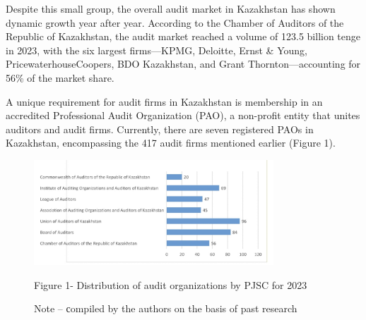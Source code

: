 \begin{multicols}{2}
Despite this small group, the overall audit market in Kazakhstan has
shown dynamic growth year after year. According to the Chamber of
Auditors of the Republic of Kazakhstan, the audit market reached a
volume of 123.5 billion tenge in 2023, with the six largest
firms---KPMG, Deloitte, Ernst \& Young, PricewaterhouseCoopers, BDO
Kazakhstan, and Grant Thornton---accounting for 56\% of the market
share.

A unique requirement for audit firms in Kazakhstan is membership in an
accredited Professional Audit Organization (PAO), a non-profit entity
that unites auditors and audit firms. Currently, there are seven
registered PAOs in Kazakhstan, encompassing the 417 audit firms
mentioned earlier (Figure 1).
\end{multicols}


\begin{figure}[H]
	\centering
	\includegraphics[width=0.8\textwidth]{media/ekon/image7.2}
	\caption*{Figure 1- Distribution of audit organizations by PJSC for 2023}
	\caption*{Note -- сompiled by the authors on the basis of past research}

\end{figure}

